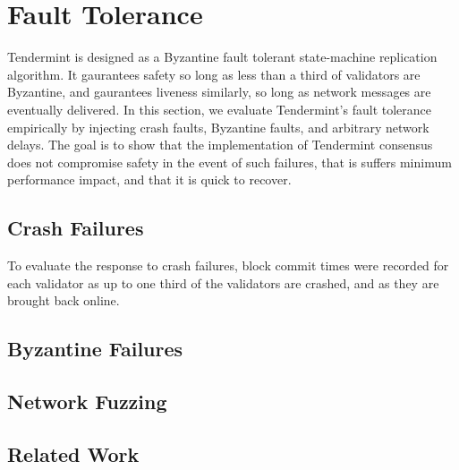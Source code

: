 \chapter{Fault Tolerance}

Tendermint is designed as a Byzantine fault tolerant state-machine replication algorithm.
It gaurantees safety so long as less than a third of validators are Byzantine, 
and gaurantees liveness similarly, so long as network messages are eventually delivered.
In this section, we evaluate Tendermint's fault tolerance empirically by injecting 
crash faults, Byzantine faults, and arbitrary network delays.
The goal is to show that the implementation of Tendermint consensus does not compromise safety in the event of such failures,
that is suffers minimum performance impact, and that it is quick to recover.

\section{Crash Failures}

To evaluate the response to crash failures, 
block commit times were recorded for each validator as up to one third of the validators are crashed,
and as they are brought back online. 


\section{Byzantine Failures}

\section{Network Fuzzing}

\section{Related Work}

